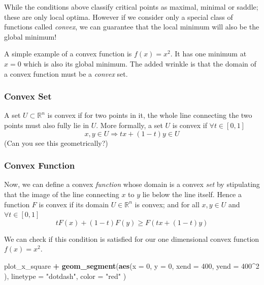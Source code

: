 \documentclass[11pt,]{article}
\newenvironment{Shaded}{\begin{snugshade}}{\end{snugshade}}
\newcommand{\KeywordTok}[1]{\textcolor[rgb]{0.13,0.29,0.53}{\textbf{#1}}}
\newcommand{\DataTypeTok}[1]{\textcolor[rgb]{0.13,0.29,0.53}{#1}}
\newcommand{\DecValTok}[1]{\textcolor[rgb]{0.00,0.00,0.81}{#1}}
\newcommand{\StringTok}[1]{\textcolor[rgb]{0.31,0.60,0.02}{#1}}
\newcommand{\OperatorTok}[1]{\textcolor[rgb]{0.81,0.36,0.00}{\textbf{#1}}}
\newcommand{\NormalTok}[1]{#1}
\begin{document}
While the conditions above classify critical points as maximal, minimal
or saddle; these are only local optima. However if we consider only a
special class of functions called \emph{convex}, we can guarantee that
the local minimum will also be the global minimum!

A simple example of a convex function is \(f(x) = x^2\). It has one
minimum at \(x=0\) which is also its global minimum. The added wrinkle
is that the domain of a convex function must be a \emph{convex} set.

\subsubsection{Convex Set}\label{convex-set}

A set \(U\subset \mathbb{R}^n\) is convex if for two points in it, the
whole line connecting the two points must also fully lie in \(U\). More
formally, a set \(U\) is convex if \(\forall t\in[0,1]\) \[
x, y \in U \Rightarrow tx+(1-t)y\in U
\] (Can you see this geometrically?)

\subsubsection{Convex Function}\label{convex-function}

Now, we can define a convex \emph{function} whose domain is a convex
\emph{set} by stipulating that the image of the line connecting \(x\) to
\(y\) lie below the line itself. Hence a function \(F\) is convex if its
domain \(U\in \mathbb{R}^n\) is convex; and for all \(x, y\in U\) and
\(\forall t\in[0,1]\) \[
tF(x) + (1-t)F(y) \geq F(tx + (1-t)y)
\]

We can check if this condition is satisfied for our one dimensional
convex function \(f(x)=x^2\).

\begin{Shaded}
\begin{Highlighting}[]
\NormalTok{plot_x_square }\OperatorTok{+}\StringTok{ }
\StringTok{  }\KeywordTok{geom_segment}\NormalTok{(}\KeywordTok{aes}\NormalTok{(}\DataTypeTok{x =} \DecValTok{0}\NormalTok{, }
                   \DataTypeTok{y =} \DecValTok{0}\NormalTok{, }
                   \DataTypeTok{xend =} \DecValTok{400}\NormalTok{, }
                   \DataTypeTok{yend =} \DecValTok{400}\OperatorTok{^}\DecValTok{2}
\NormalTok{                   ), }
               \DataTypeTok{linetype =} \StringTok{"dotdash"}\NormalTok{, }
               \DataTypeTok{color =} \StringTok{"red"}
\NormalTok{               )}
\end{Highlighting}
\end{Shaded}
\end{document}
